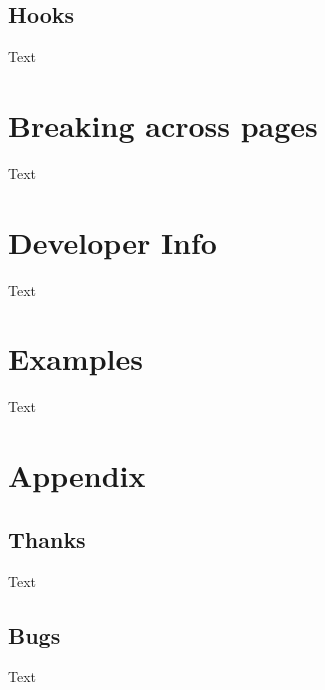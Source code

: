 \documentclass[openany,12pt,tocdepth=3]{ltx-md}
\begin{document}
\section{Hooks}\label{sec:hook}
Text 
\chapter{Breaking across pages}\label{chap:break}
Text 
\chapter{Developer Info}\label{chap:developer-info}
Text 

\chapter{Examples}\label{chap:examples}
Text 

\appendix
\chapter{Appendix}\label{chap:appendix}
\section{Thanks}
Text 
\section{Bugs}
Text 
\end{document}
